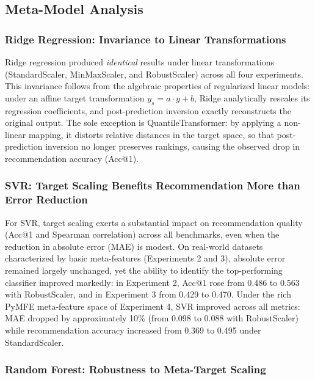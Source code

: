 \documentclass[12pt]{article}
\begin{document}
\subsection{Meta-Model Analysis}

\subsubsection{Ridge Regression: Invariance to Linear Transformations}

Ridge regression produced \textit{identical} results under linear transformations (StandardScaler, MinMaxScaler, and RobustScaler) across all four experiments. This invariance follows from the algebraic properties of regularized linear models: under an affine target transformation $y_s = a \cdot y + b$, Ridge analytically rescales its regression coefficients, and post-prediction inversion exactly reconstructs the original output. The sole exception is QuantileTransformer: by applying a non-linear mapping, it distorts relative distances in the target space, so that post-prediction inversion no longer preserves rankings, causing the observed drop in recommendation accuracy (Acc@1).

\subsubsection{SVR: Target Scaling Benefits Recommendation More than Error Reduction}

For SVR, target scaling exerts a substantial impact on recommendation quality (Acc@1 and Spearman correlation) across all benchmarks, even when the reduction in absolute error (MAE) is modest. On real-world datasets characterized by basic meta-features (Experiments 2 and 3), absolute error remained largely unchanged, yet the ability to identify the top-performing classifier improved markedly: in Experiment 2, Acc@1 rose from 0.486 to 0.563 with RobustScaler, and in Experiment 3 from 0.429 to 0.470. Under the rich PyMFE meta-feature space of Experiment 4, SVR improved across all metrics: MAE dropped by approximately 10\% (from 0.098 to 0.088 with RobustScaler) while recommendation accuracy increased from 0.369 to 0.495 under StandardScaler.

\subsubsection{Random Forest: Robustness to Meta-Target Scaling}
\end{document}
